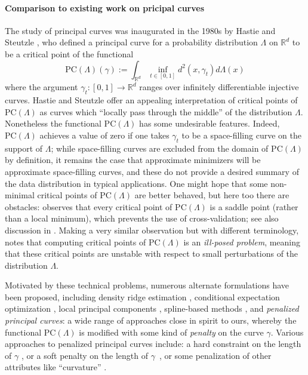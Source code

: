\documentclass[aos, preprint]{imsart}
\theoremstyle{plain}
\theoremstyle{remark}
\begin{document}
\paragraph*{Comparison to existing work on pricipal curves}

The study of principal curves was inaugurated in the 1980s by Hastie and Steutzle \cite{hastie1984, hastie1989}, who defined a principal curve for a probability distribution $\Lambda$ on $\mathbb{R}^d$ to be a critical point of the functional
\[
\mathrm{PC}(\Lambda)(\gamma):=\int_{\mathbb{R}^d}\inf_{t\in[0,1]}d^2(x,\gamma_t)d\Lambda(x)
\]
where the argument $\gamma_t:[0,1]\rightarrow \mathbb{R}^d$ ranges
over infinitely differentiable injective curves. Hastie and Steutzle
offer an appealing interpretation of critical points of
$\mathrm{PC}(\Lambda)$ as curves which ``locally pass through the
middle'' of the distribution $\Lambda$. Nonetheless the functional $\mathrm{PC}(\Lambda)$ has some undesirable features. Indeed, $\mathrm{PC}(\Lambda)$ achieves a value of zero if one takes $\gamma_t$ to be a space-filling curve on the support of $\Lambda$; while space-filling curves are excluded from the domain of $\mathrm{PC}(\Lambda)$ by definition, it remains the case that approximate minimizers will be approximate space-filling curves, and these do not provide a desired summary of the data distribution in typical applications. One might hope that some non-minimal critical points of $\mathrm{PC}(\Lambda)$ are better behaved, but here too there are obstacles: \cite{duchamp1996extremal} observes that every critical point of $\mathrm{PC}(\Lambda)$ is a saddle point (rather than a local minimum), which prevents the use of cross-validation; see also discussion in \cite{gerber2013principal}. Making a very similar observation but with different terminology, \cite{smola2001regularized} notes that computing critical points of $\mathrm{PC}(\Lambda)$ is an \emph{ill-posed problem}, meaning that these critical points are unstable with respect to small perturbations of the distribution $\Lambda$.

Motivated by these technical problems, numerous alternate formulations
have been proposed, including density ridge estimation
\cite{ozertem2011locally, genovese2012geometry,
  genovese2014nonparametric, chen2015asymptotic}, conditional
expectation optimization \cite{gerber2013principal}, local principal
components \cite{delicado2001another},  spline-based methods
\cite{tibshirani1992principal}, and {\em penalized principal curves}:
a wide range of approaches close in spirit to ours, whereby the
functional $\mathrm{PC}(\Lambda)$ is modified with some kind of
\emph{penalty} on the curve $\gamma$. Various approaches to penalized
principal curves include: a hard constraint on the length of $\gamma$
\cite{kegl2000, delattre2020}, or a soft penalty on the length of
$\gamma$~\cite{smola2001regularized,lu2015regularity}, or some
penalization of other attributes like ``curvature'' \cite{Biau2011Oct, lu2021average, sandilya2002principal,kobayashi2024monge}.
\end{document}
